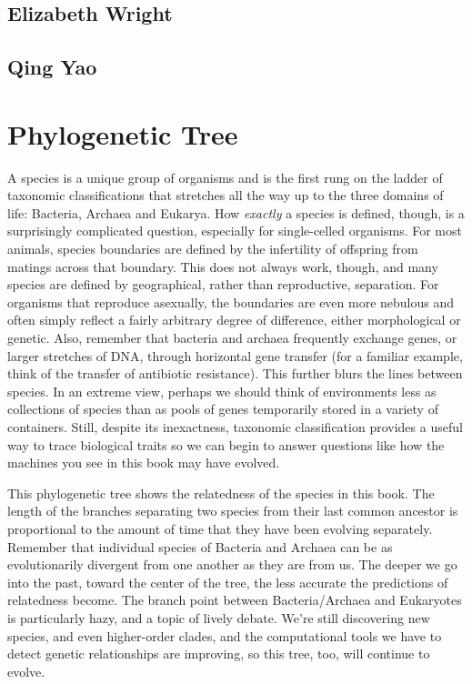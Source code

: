 \documentclass[]{tufte-book}
\begin{document}
\hypertarget{elizabeth_wright}{%
\section*{Elizabeth Wright}\label{elizabeth_wright}}

\hypertarget{qing_yao}{%
\section*{Qing Yao}\label{qing_yao}}

\hypertarget{tree}{%
\chapter{Phylogenetic Tree}\label{tree}}

A species is a unique group of organisms and is the first rung on the ladder of taxonomic classifications that stretches all the way up to the three domains of life: Bacteria, Archaea and Eukarya. How \emph{exactly} a species is defined, though, is a surprisingly complicated question, especially for single-celled organisms. For most animals, species boundaries are defined by the infertility of offspring from matings across that boundary. This does not always work, though, and many species are defined by geographical, rather than reproductive, separation. For organisms that reproduce asexually, the boundaries are even more nebulous and often simply reflect a fairly arbitrary degree of difference, either morphological or genetic. Also, remember that bacteria and archaea frequently exchange genes, or larger stretches of DNA, through horizontal gene transfer (for a familiar example, think of the transfer of antibiotic resistance). This further blurs the lines between species. In an extreme view, perhaps we should think of environments less as collections of species than as pools of genes temporarily stored in a variety of containers. Still, despite its inexactness, taxonomic classification provides a useful way to trace biological traits so we can begin to answer questions like how the machines you see in this book may have evolved.

This phylogenetic tree shows the relatedness of the species in this book. The length of the branches separating two species from their last common ancestor is proportional to the amount of time that they have been evolving separately. Remember that individual species of Bacteria and Archaea can be as evolutionarily divergent from one another as they are from us. The deeper we go into the past, toward the center of the tree, the less accurate the predictions of relatedness become. The branch point between Bacteria/Archaea and Eukaryotes is particularly hazy, and a topic of lively debate. We're still discovering new species, and even higher-order clades, and the computational tools we have to detect genetic relationships are improving, so this tree, too, will continue to evolve.
\end{document}
